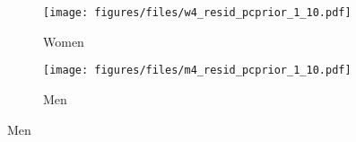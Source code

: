 \begin{figure}[htp]
\caption{Residuals \newline Model \textit{Covariates} in Tables \ref{tbl:w_age_pcprior_1_10} and \ref{tbl:m_age_pcprior_1_10}}
\centering

  \begin{subfigure}[b]{.50\linewidth}
    \centering
       \caption{Women}
    \texttt{[image: figures/files/w4\_resid\_pcprior\_1\_10.pdf]}
  \end{subfigure}%

 \begin{subfigure}[b]{.50\linewidth}
   \caption{Men}
    \centering
    \texttt{[image: figures/files/m4\_resid\_pcprior\_1\_10.pdf]}
  \end{subfigure}%
  \label{fig:resid_pcprior_1_10}
\end{figure}
